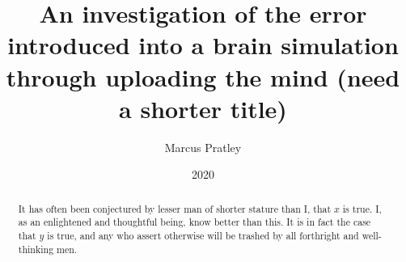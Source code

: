\documentclass[10pt,twoside,openright]{report}
\title{An investigation of the error introduced into a brain simulation through uploading the mind (need a shorter title)}
\author{Marcus Pratley}
\date{2020}
\begin{document}
\maketitle

\declaration

\dedication{To my friends, my family \\ and the moon, \\ with whom I've shared many secrets, none of which have yet been published. }

\begin{abstract}
It has often been conjectured by lesser man of shorter stature than I, that $x$ is true. I, as an enlightened and thoughtful being, know better than this. It is in fact the case that $y$ is true, and any who assert otherwise will be trashed by all forthright and well-thinking men.
\end{abstract}

\tableofcontents








\printbibliography[heading=bibintoc]
\end{document}
